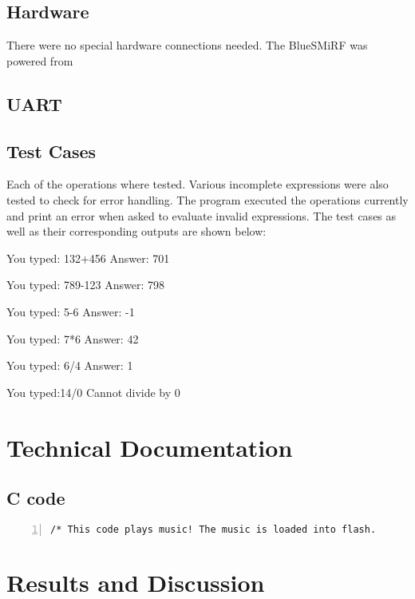 \documentclass[11pt]{article}
\begin{document}
\subsection{Hardware}
There were no special hardware connections needed. The BlueSMiRF was powered from 


\subsection{UART}


\subsection{Test Cases}
Each of the operations where tested. Various incomplete expressions were also tested to check for error handling. The program executed the operations currently and print an error when asked to evaluate invalid expressions. The test cases as well as their corresponding outputs are shown below:




You typed: 132+456
Answer: 701

You typed: 789-123
Answer: 798

You typed: 5-6
Answer: -1

You typed: 7*6
Answer: 42

You typed: 6/4
Answer: 1

You typed:14/0
Cannot divide by 0


\clearpage

\section{Technical Documentation}

\subsection{C code}

\begin{lstlisting}[numbers=left,basicstyle=\footnotesize]
/* This code plays music! The music is loaded into flash.

\end{lstlisting}



\clearpage

\clearpage

\section{Results and Discussion}
\end{document}
